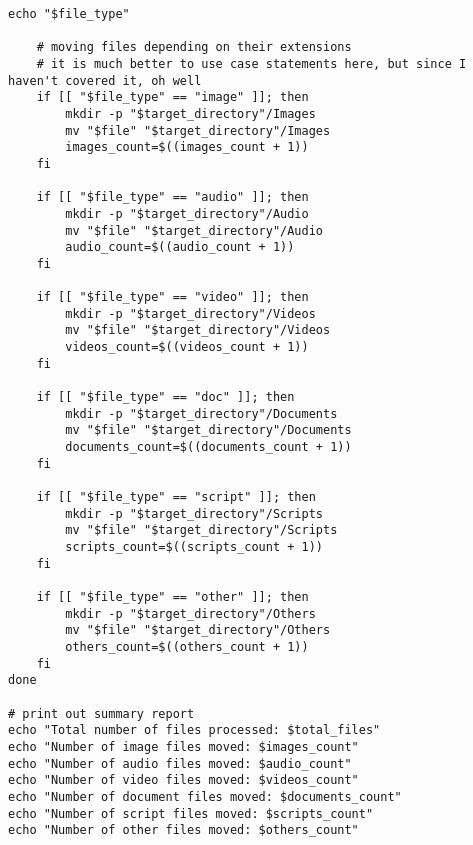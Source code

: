 \documentclass[10pt, a4paper]{article}
\begin{document}
\begin{multicols}{3}
\begin{lstlisting}[style=pythoncompact]
    echo "$file_type"

    # moving files depending on their extensions
    # it is much better to use case statements here, but since I haven't covered it, oh well
    if [[ "$file_type" == "image" ]]; then
        mkdir -p "$target_directory"/Images
        mv "$file" "$target_directory"/Images
        images_count=$((images_count + 1))
    fi

    if [[ "$file_type" == "audio" ]]; then
        mkdir -p "$target_directory"/Audio
        mv "$file" "$target_directory"/Audio
        audio_count=$((audio_count + 1))
    fi

    if [[ "$file_type" == "video" ]]; then
        mkdir -p "$target_directory"/Videos
        mv "$file" "$target_directory"/Videos
        videos_count=$((videos_count + 1))
    fi

    if [[ "$file_type" == "doc" ]]; then
        mkdir -p "$target_directory"/Documents
        mv "$file" "$target_directory"/Documents
        documents_count=$((documents_count + 1))
    fi

    if [[ "$file_type" == "script" ]]; then
        mkdir -p "$target_directory"/Scripts
        mv "$file" "$target_directory"/Scripts
        scripts_count=$((scripts_count + 1))
    fi

    if [[ "$file_type" == "other" ]]; then
        mkdir -p "$target_directory"/Others
        mv "$file" "$target_directory"/Others
        others_count=$((others_count + 1))
    fi
done

# print out summary report
echo "Total number of files processed: $total_files"
echo "Number of image files moved: $images_count"
echo "Number of audio files moved: $audio_count"
echo "Number of video files moved: $videos_count"
echo "Number of document files moved: $documents_count"
echo "Number of script files moved: $scripts_count"
echo "Number of other files moved: $others_count"

\end{lstlisting}
\end{multicols}
\end{document}
